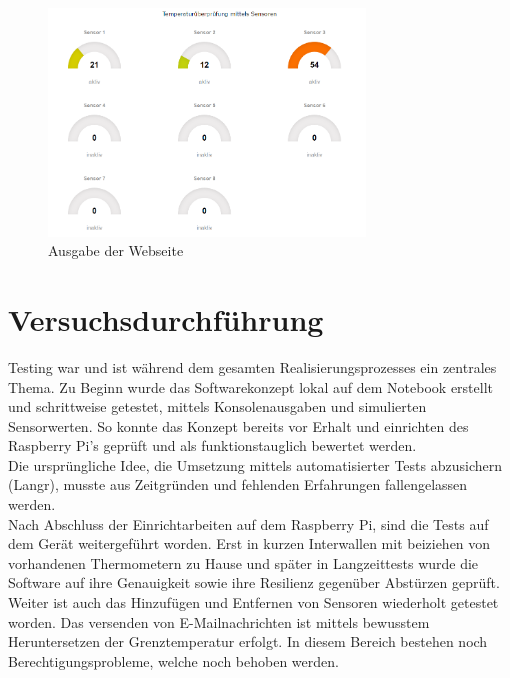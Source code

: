 \begin{figure}[H]%
\centering
\includegraphics[width=0.75\textwidth]{Images/Webseite.png}
\caption{Ausgabe der Webseite}
\label{fig:webpage}
\end{figure}

\section{Versuchsdurchführung}
Testing war und ist während dem gesamten Realisierungsprozesses ein zentrales Thema. Zu Beginn wurde das Softwarekonzept lokal auf dem Notebook erstellt und schrittweise getestet, mittels Konsolenausgaben und simulierten Sensorwerten. So konnte das Konzept bereits vor Erhalt und einrichten des Raspberry Pi's geprüft und als funktionstauglich bewertet werden.\\
Die ursprüngliche Idee, die Umsetzung mittels automatisierter Tests abzusichern (Langr), musste aus Zeitgründen und fehlenden Erfahrungen fallengelassen werden.\\
Nach Abschluss der Einrichtarbeiten auf dem Raspberry Pi, sind die Tests auf dem Gerät weitergeführt worden. Erst in kurzen Interwallen mit beiziehen von vorhandenen Thermometern zu Hause und später in Langzeittests wurde die Software auf ihre Genauigkeit sowie ihre Resilienz gegenüber Abstürzen geprüft. Weiter ist auch das Hinzufügen und Entfernen von Sensoren wiederholt getestet worden. Das versenden von E-Mailnachrichten ist mittels bewusstem Heruntersetzen der Grenztemperatur erfolgt. In diesem Bereich bestehen noch Berechtigungsprobleme, welche noch behoben werden.